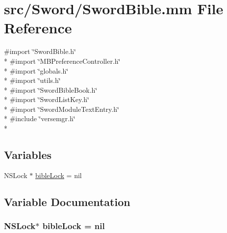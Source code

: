 \hypertarget{_sword_bible_8mm}{\section{src/\-Sword/\-Sword\-Bible.mm File Reference}
\label{_sword_bible_8mm}
}
{\ttfamily \#import \char`\"{}Sword\-Bible.\-h\char`\"{}}\\*
{\ttfamily \#import \char`\"{}M\-B\-Preference\-Controller.\-h\char`\"{}}\\*
{\ttfamily \#import \char`\"{}globals.\-h\char`\"{}}\\*
{\ttfamily \#import \char`\"{}utils.\-h\char`\"{}}\\*
{\ttfamily \#import \char`\"{}Sword\-Bible\-Book.\-h\char`\"{}}\\*
{\ttfamily \#import \char`\"{}Sword\-List\-Key.\-h\char`\"{}}\\*
{\ttfamily \#import \char`\"{}Sword\-Module\-Text\-Entry.\-h\char`\"{}}\\*
{\ttfamily \#include \char`\"{}versemgr.\-h\char`\"{}}\\*
\subsection*{Variables}
\begin{DoxyCompactItemize}
\item 
N\-S\-Lock $\ast$ \hyperlink{_sword_bible_8mm_a61f96fda4b37407a50e4257d3597622a}{bible\-Lock} = nil
\end{DoxyCompactItemize}


\subsection{Variable Documentation}
\hypertarget{_sword_bible_8mm_a61f96fda4b37407a50e4257d3597622a}{
\subsubsection[{bible\-Lock}]{\setlength{\rightskip}{0pt plus 5cm}N\-S\-Lock$\ast$ bible\-Lock = nil}}\label{_sword_bible_8mm_a61f96fda4b37407a50e4257d3597622a}

